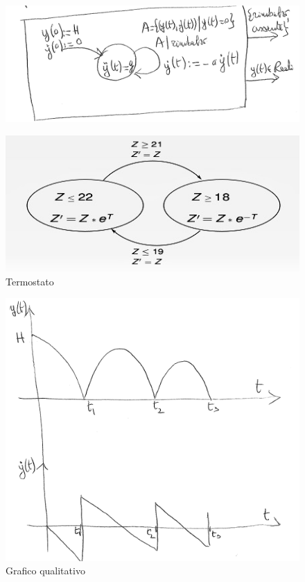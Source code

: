 \documentclass[a4paper, notitlepage, 10pt]{report}
\begin{document}
\begin{multicols}{2}
	\begin{figure}[H]
		\centering
		\includegraphics[scale=0.40, angle=-3.5]{SistemaIbrido}
	\end{figure}
	\begin{figure}[H]
		\centering
		\includegraphics[scale=0.40]{Termostato}
		\captionsetup{labelformat=empty}
		\caption{Termostato}
	\end{figure}
	\columnbreak	
	\begin{figure}[H]
		\centering
		\includegraphics[scale=0.40, angle=-0.7]{Palla}
		\captionsetup{labelformat=empty}
		\caption{Grafico qualitativo}
	\end{figure}
\end{multicols}
\end{document}
